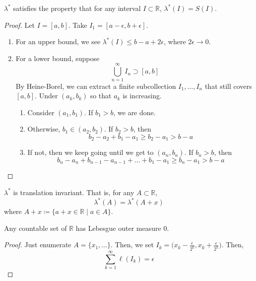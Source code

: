   \begin{theorem}
    $\lambda^\ast$ satisfies the property that for any interval $I \subset \mathbb{R}$, $\lambda^\ast (I) = S(I)$. 
  \end{theorem}
  \begin{proof}
    Let $I = [a, b]$. Take $I_1 = [a - \epsilon, b + \epsilon]$. 
    \begin{enumerate}
      \item For an upper bound, we see $\lambda^\ast (I) \leq b - a + 2\epsilon$, where $2 \epsilon \to 0$. 
      \item For a lower bound, suppose 
      \begin{equation}
        \bigcup_{n=1}^\infty I_n \supset [a, b] 
      \end{equation}
      By Heine-Borel, we can extract a finite subcollection $I_1, \ldots, I_n$ that still covers $[a, b]$. Under $(a_k, b_k)$ so that $a_k$ is increasing. 
      \begin{enumerate}
        \item Consider $(a_1, b_1)$. If $b_1 > b$, we are done. 
        \item Otherwise, $b_1 \in (a_2, b_2)$. If $b_2 > b$, then 
        \begin{equation}
          b_2 - a_2 + b_1 - a_1 \geq b_2 - a_1 > b - a
        \end{equation}
        \item If not, then we keep going until we get to $(a_n, b_n)$. If $b_n > b$, then 
          \begin{equation}
            b_n - a_n + b_{n-1} - a_{n-1} + \ldots + b_1 - a_1 \geq b_n - a_1  > b - a
          \end{equation}
      \end{enumerate}
    \end{enumerate}
  \end{proof}

  \begin{corollary}
    $\lambda^\ast$ is translation invariant. That is, for any $A \subset \mathbb{R}$, 
    \begin{equation}
      \lambda^\ast (A) = \lambda^\ast (A + x)
    \end{equation}
    where $A + x \coloneqq \{a + x \in \mathbb{R} \mid a \in A \}$. 
  \end{corollary}

  \begin{theorem}
    Any countable set of $\mathbb{R}$ has Lebesgue outer measure $0$. 
  \end{theorem}
  \begin{proof}
    Just enumerate $A = \{x_1, \ldots \}$. Then, we set $I_k = \big( x_k - \frac{\epsilon}{2^k}, x_k + \frac{\epsilon}{2^k} \big)$. Then, 
    \begin{equation}
      \sum_{k=1}^\infty \ell(I_k) = \epsilon
    \end{equation}
  \end{proof} 

